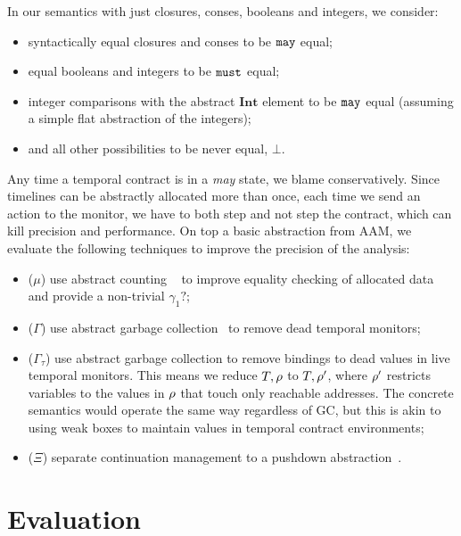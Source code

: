 %
In our semantics with just closures, conses, booleans and integers, we consider:
\begin{itemize}
 \item syntactically equal closures and conses to be ${\tt may}$ equal;
 \item equal booleans and integers to be ${\tt must}$ equal;
 \item integer comparisons with the abstract $\mathbf{Int}$ element to be ${\tt may}$ equal (assuming a simple flat abstraction of the integers);
 \item and all other possibilities to be never equal, $\bot$.
\end{itemize}
%
Any time a temporal contract is in a \emph{may} state, we blame conservatively.
%
Since timelines can be abstractly allocated more than once, each time we send an action to the monitor, we have to both step and not step the contract, which can kill precision and performance.
%
On top a basic abstraction from AAM, we evaluate the following techniques to improve the precision of the analysis:
\begin{itemize}
\item{($\mu$) use abstract counting ~\citep{dvanhorn:Might:2006:GammaCFA} to improve equality checking of allocated data and provide a non-trivial $\gamma_1?$;}
\item{($\Gamma$) use abstract garbage collection~\citep{dvanhorn:Might:2006:GammaCFA} to remove dead temporal monitors;}
\item{($\Gamma_\tau$) use abstract garbage collection to remove bindings to dead values in live temporal monitors.
%
This means we reduce $T,\rho$ to $T,\rho'$, where $\rho'$ restricts variables to the values in $\rho$ that touch only reachable addresses.
%
The concrete semantics would operate the same way regardless of GC, but this is akin to using weak boxes to maintain values in temporal contract environments;}
\item{($\Xi$) separate continuation management to a pushdown abstraction~\citep{dvanhorn:Vardoulakis2011CFA2}.}%
\end{itemize}

\section{Evaluation}\label{sec:evaluation}

